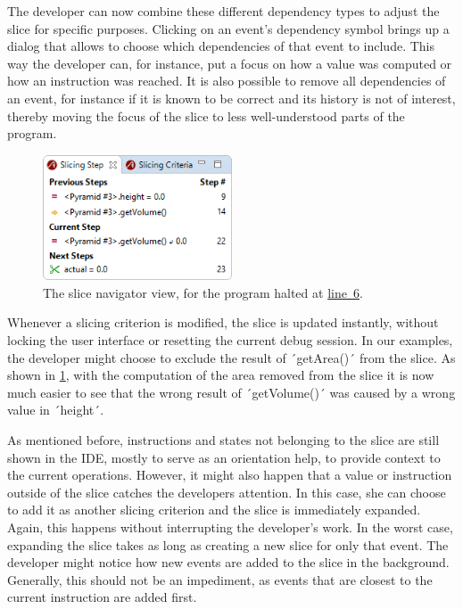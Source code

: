 \documentclass[english]{scrartcl}
\newcommand{\linerefn}[2]{\hyperref[#1]{line~#2}}
\begin{document}
The developer can now combine these different dependency types to adjust the slice for specific purposes.
Clicking on an event's dependency symbol brings up a dialog that allows to choose which dependencies of that event to include.
This way the developer can, for instance, put a focus on how a value was computed or how an instruction was reached.
It is also possible to remove all dependencies of an event, for instance if it is known to be correct and its history is not of interest, thereby moving the focus of the slice to less well-understood parts of the program.

\begin{figure}
	\centering
		\includegraphics[width=0.50\textwidth]{img/slice2.png}
	\caption{The slice navigator view, for the program halted at \linerefn{lst:example}{6}.}
	\label{fig:slice2}
\end{figure}

Whenever a slicing criterion is modified, the slice is updated instantly, without locking the user interface or resetting the current debug session.
In our examples, the developer might choose to exclude the result of ´getArea()´ from the slice. 
As shown in \cref{fig:slice2}, with the computation of the area removed from the slice it is now much easier to see that the wrong result of ´getVolume()´ was caused by a wrong value in ´height´.


As mentioned before, instructions and states not belonging to the slice are still shown in the IDE, mostly to serve as an orientation help, to provide context to the current operations.
However, it might also happen that a value or instruction outside of the slice catches the developers attention.
In this case, she can choose to add it as another slicing criterion and the slice is immediately expanded.
Again, this happens without interrupting the developer's work.
In the worst case, expanding the slice takes as long as creating a new slice for only that event.
The developer might notice how new events are added to the slice in the background.
Generally, this should not be an impediment, as events that are closest to the current instruction are added first.
\end{document}
